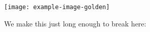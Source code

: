 \documentclass[a5paper]{scrartcl}
\begin{document}
  \begin{figure*}[t]
    \texttt{[image: example-image-golden]}
  \end{figure*}
  \lipsum[1]
  We make this just long enough to break here:
  \citep{strunk-and-white}
  
\end{document}
